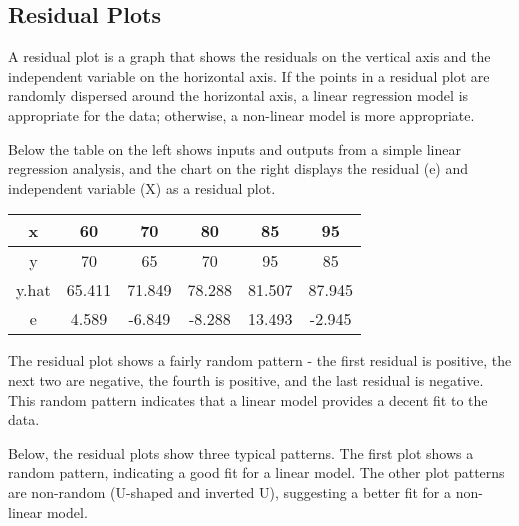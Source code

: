\documentclass[main.tex]{subfiles}
\begin{document}
	\subsection{Residual Plots}
	A residual plot is a graph that shows the residuals on the vertical axis and the independent variable on the horizontal axis. If the points in a residual plot are randomly dispersed around the horizontal axis, a linear regression model is appropriate for the data; otherwise, a non-linear model is more appropriate.
	
	Below the table on the left shows inputs and outputs from a simple linear regression analysis, and the chart on the right displays the residual (e) and independent variable (X) as a residual plot.
	
	\begin{center}
		\begin{tabular}{|c|c|c|c|c|c|}
			x &	60	& 70	& 80	& 85 &	95 \\ \hline
			y &	70	& 65	& 70	& 95 &	85 \\ \hline
			y.hat	& 65.411 &	71.849 &	78.288 &	81.507	& 87.945 \\ \hline
			e	& 4.589	& -6.849 &	-8.288 &	13.493 &	-2.945 \\ \hline
		\end{tabular}
	\end{center}
	
	The residual plot shows a fairly random pattern - the first residual is positive, the next two are negative, the fourth is positive, and the last residual is negative. This random pattern indicates that a linear model provides a decent fit to the data.
	
	Below, the residual plots show three typical patterns. The first plot shows a random pattern, indicating a good fit for a linear model. The other plot patterns are non-random (U-shaped and inverted U), suggesting a better fit for a non-linear model.
	\newpage
	\Large
\end{document}
